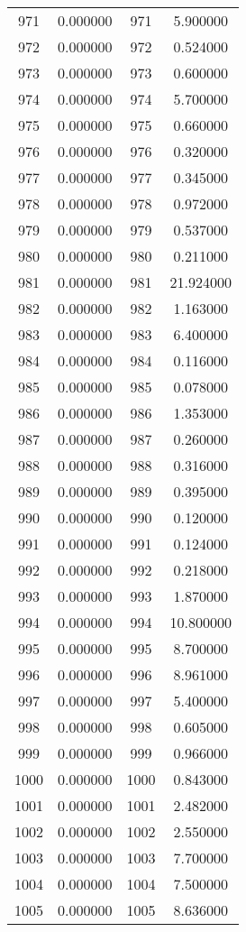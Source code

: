 \documentclass[12pt]{article}
\begin{document}
\begin{longtable}{@{}cccc@{}}
971 & 0.000000 & 971 & 5.900000 \\
972 & 0.000000 & 972 & 0.524000 \\
973 & 0.000000 & 973 & 0.600000 \\
974 & 0.000000 & 974 & 5.700000 \\
975 & 0.000000 & 975 & 0.660000 \\
976 & 0.000000 & 976 & 0.320000 \\
977 & 0.000000 & 977 & 0.345000 \\
978 & 0.000000 & 978 & 0.972000 \\
979 & 0.000000 & 979 & 0.537000 \\
980 & 0.000000 & 980 & 0.211000 \\
981 & 0.000000 & 981 & 21.924000 \\
982 & 0.000000 & 982 & 1.163000 \\
983 & 0.000000 & 983 & 6.400000 \\
984 & 0.000000 & 984 & 0.116000 \\
985 & 0.000000 & 985 & 0.078000 \\
986 & 0.000000 & 986 & 1.353000 \\
987 & 0.000000 & 987 & 0.260000 \\
988 & 0.000000 & 988 & 0.316000 \\
989 & 0.000000 & 989 & 0.395000 \\
990 & 0.000000 & 990 & 0.120000 \\
991 & 0.000000 & 991 & 0.124000 \\
992 & 0.000000 & 992 & 0.218000 \\
993 & 0.000000 & 993 & 1.870000 \\
994 & 0.000000 & 994 & 10.800000 \\
995 & 0.000000 & 995 & 8.700000 \\
996 & 0.000000 & 996 & 8.961000 \\
997 & 0.000000 & 997 & 5.400000 \\
998 & 0.000000 & 998 & 0.605000 \\
999 & 0.000000 & 999 & 0.966000 \\
1000 & 0.000000 & 1000 & 0.843000 \\
1001 & 0.000000 & 1001 & 2.482000 \\
1002 & 0.000000 & 1002 & 2.550000 \\
1003 & 0.000000 & 1003 & 7.700000 \\
1004 & 0.000000 & 1004 & 7.500000 \\
1005 & 0.000000 & 1005 & 8.636000 \\

\end{longtable}
\end{document}
